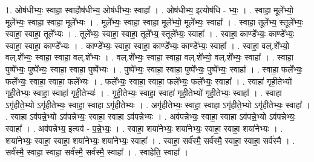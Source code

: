 \documentclass[17pt]{extarticle}
\begin{document}
1. ओष॑धीभ्यः॒ स्वाहा॒ स्वाहौष॑धीभ्य॒ ओष॑धीभ्यः॒ स्वाहा᳚ । . ओष॑धीभ्य॒ इत्योष॑धि - भ्यः॒ । . स्वाहा॒ मूले᳚भ्यो॒ मूले᳚भ्यः॒ स्वाहा॒ स्वाहा॒ मूले᳚भ्यः । . मूले᳚भ्यः॒ स्वाहा॒ स्वाहा॒ मूले᳚भ्यो॒ मूले᳚भ्यः॒ स्वाहा᳚ । . स्वाहा॒ तूले᳚भ्य॒ स्तूले᳚भ्यः॒ स्वाहा॒ स्वाहा॒ तूले᳚भ्यः । . तूले᳚भ्यः॒ स्वाहा॒ स्वाहा॒ तूले᳚भ्य॒ स्तूले᳚भ्यः॒ स्वाहा᳚ । . स्वाहा॒ काण्डे᳚भ्यः॒ काण्डे᳚भ्यः॒ स्वाहा॒ स्वाहा॒ काण्डे᳚भ्यः । . काण्डे᳚भ्यः॒ स्वाहा॒ स्वाहा॒ काण्डे᳚भ्यः॒ काण्डे᳚भ्यः॒ स्वाहा᳚ । . स्वाहा॒ वल्.शे᳚भ्यो॒ वल्.शे᳚भ्यः॒ स्वाहा॒ स्वाहा॒ वल्.शे᳚भ्यः । . वल्.शे᳚भ्यः॒ स्वाहा॒ स्वाहा॒ वल्.शे᳚भ्यो॒ वल्.शे᳚भ्यः॒ स्वाहा᳚ । . स्वाहा॒ पुष्पे᳚भ्यः॒ पुष्पे᳚भ्यः॒ स्वाहा॒ स्वाहा॒ पुष्पे᳚भ्यः । . पुष्पे᳚भ्यः॒ स्वाहा॒ स्वाहा॒ पुष्पे᳚भ्यः॒ पुष्पे᳚भ्यः॒ स्वाहा᳚ । . स्वाहा॒ फले᳚भ्यः॒ फले᳚भ्यः॒ स्वाहा॒ स्वाहा॒ फले᳚भ्यः । . फले᳚भ्यः॒ स्वाहा॒ स्वाहा॒ फले᳚भ्यः॒ फले᳚भ्यः॒ स्वाहा᳚ । . स्वाहा॑ गृही॒तेभ्यो॑ गृही॒तेभ्यः॒ स्वाहा॒ स्वाहा॑ गृही॒तेभ्यः॑ । . गृ॒ही॒तेभ्यः॒ स्वाहा॒ स्वाहा॑ गृही॒तेभ्यो॑ गृही॒तेभ्यः॒ स्वाहा᳚ । . स्वाहा ऽगृ॑हीते॒भ्यो ऽगृ॑हीतेभ्यः॒ स्वाहा॒ स्वाहा ऽगृ॑हीतेभ्यः । . अगृ॑हीतेभ्यः॒ स्वाहा॒ स्वाहा ऽगृ॑हीते॒भ्यो ऽगृ॑हीतेभ्यः॒ स्वाहा᳚ । . स्वाहा ऽव॑पन्ने॒भ्यो ऽव॑पन्नेभ्यः॒ स्वाहा॒ स्वाहा ऽव॑पन्नेभ्यः । . अव॑पन्नेभ्यः॒ स्वाहा॒ स्वाहा ऽव॑पन्ने॒भ्यो ऽव॑पन्नेभ्यः॒ स्वाहा᳚ । . अव॑पन्नेभ्य॒ इत्यव॑ - प॒न्ने॒भ्यः॒ । . स्वाहा॒ शया॑नेभ्यः॒ शया॑नेभ्यः॒ स्वाहा॒ स्वाहा॒ शया॑नेभ्यः । . शया॑नेभ्यः॒ स्वाहा॒ स्वाहा॒ शया॑नेभ्यः॒ शया॑नेभ्यः॒ स्वाहा᳚ । . स्वाहा॒ सर्व॑स्मै॒ सर्व॑स्मै॒ स्वाहा॒ स्वाहा॒ सर्व॑स्मै । . सर्व॑स्मै॒ स्वाहा॒ स्वाहा॒ सर्व॑स्मै॒ सर्व॑स्मै॒ स्वाहा᳚ । . स्वाहेति॒ स्वाहा᳚ । \newline
\end{document}
